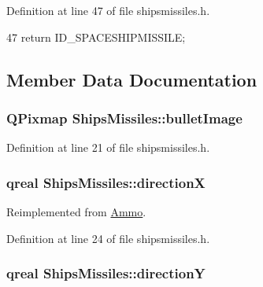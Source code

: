 Definition at line 47 of file shipsmissiles.h.


\begin{DoxyCode}
47 {return ID_SPACESHIPMISSILE; }
\end{DoxyCode}


\subsection{Member Data Documentation}
\hypertarget{class_ships_missiles_a4c2fdc36a57d2e2cd4676f254aaa84d8}{
\subsubsection[{bulletImage}]{\setlength{\rightskip}{0pt plus 5cm}QPixmap {\bf ShipsMissiles::bulletImage}}}
\label{class_ships_missiles_a4c2fdc36a57d2e2cd4676f254aaa84d8}


Definition at line 21 of file shipsmissiles.h.\hypertarget{class_ships_missiles_aad45d407d327d29bd616ca336197fe30}{
\subsubsection[{directionX}]{\setlength{\rightskip}{0pt plus 5cm}qreal {\bf ShipsMissiles::directionX}}}
\label{class_ships_missiles_aad45d407d327d29bd616ca336197fe30}


Reimplemented from \hyperlink{class_ammo_a60392d67523d0cf6d46e14b6b3f1ae05}{Ammo}.

Definition at line 24 of file shipsmissiles.h.\hypertarget{class_ships_missiles_af7e77e3dd68cb9f8d6cb90467a2a3ff0}{
\subsubsection[{directionY}]{\setlength{\rightskip}{0pt plus 5cm}qreal {\bf ShipsMissiles::directionY}}}
\label{class_ships_missiles_af7e77e3dd68cb9f8d6cb90467a2a3ff0}


